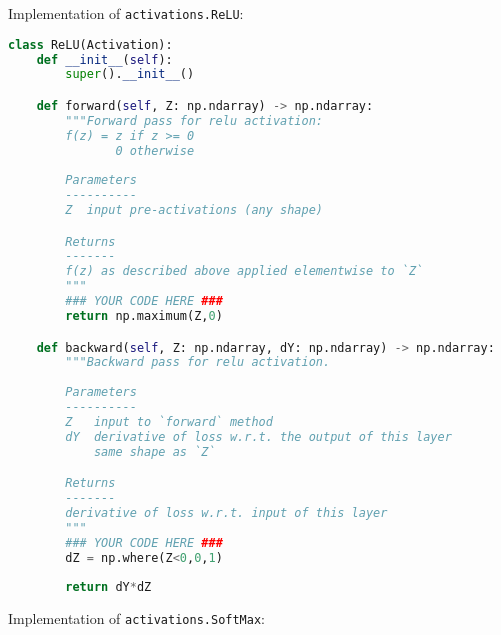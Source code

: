Implementation of \texttt{activations.ReLU}:

\begin{lstlisting}[language=Python]
class ReLU(Activation):
    def __init__(self):
        super().__init__()

    def forward(self, Z: np.ndarray) -> np.ndarray:
        """Forward pass for relu activation:
        f(z) = z if z >= 0
               0 otherwise
        
        Parameters
        ----------
        Z  input pre-activations (any shape)

        Returns
        -------
        f(z) as described above applied elementwise to `Z`
        """
        ### YOUR CODE HERE ###
        return np.maximum(Z,0)

    def backward(self, Z: np.ndarray, dY: np.ndarray) -> np.ndarray:
        """Backward pass for relu activation.
        
        Parameters
        ----------
        Z   input to `forward` method
        dY  derivative of loss w.r.t. the output of this layer
            same shape as `Z`

        Returns
        -------
        derivative of loss w.r.t. input of this layer
        """
        ### YOUR CODE HERE ###
        dZ = np.where(Z<0,0,1)
        
        return dY*dZ

\end{lstlisting}

Implementation of \texttt{activations.SoftMax}:

